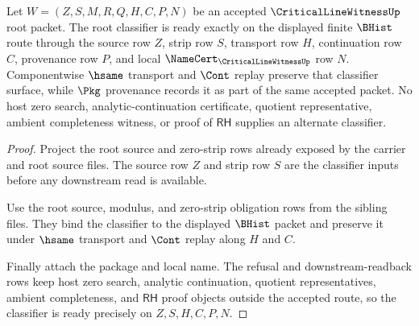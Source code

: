 \begin{theorem}
\label{thm:critical-line-witness-root-classifier-readiness}
Let $W=(Z,S,M,R,Q,H,C,P,N)$ be an accepted $\CriticalLineWitnessUp$ root
packet. The root classifier is ready exactly on the displayed finite
$\BHist$ route through the source row $Z$, strip row $S$, transport row $H$,
continuation row $C$, provenance row $P$, and local
$\NameCert_{\CriticalLineWitnessUp}$ row $N$. Componentwise $\hsame$ transport
and $\Cont$ replay preserve that classifier surface, while $\Pkg$ provenance
records it as part of the same accepted packet. No host zero search,
analytic-continuation certificate, quotient representative, ambient
completeness witness, or proof of $\mathsf{RH}$ supplies an alternate
classifier.
\end{theorem}
\begin{proof}
Project the root source and zero-strip rows already exposed by the carrier and
root source files. The source row $Z$ and strip row $S$ are the classifier
inputs before any downstream read is available.

Use the root source, modulus, and zero-strip obligation rows from the sibling
files. They bind the classifier to the displayed $\BHist$ packet and preserve
it under $\hsame$ transport and $\Cont$ replay along $H$ and $C$.

Finally attach the package and local name. The refusal and downstream-readback
rows keep host zero search, analytic continuation, quotient representatives,
ambient completeness, and $\mathsf{RH}$ proof objects outside the accepted
route, so the classifier is ready precisely on $Z,S,H,C,P,N$.
\end{proof}

